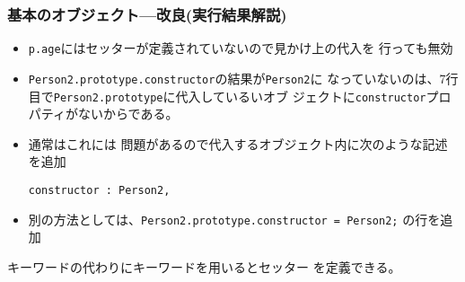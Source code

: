 \documentclass[dvipsk]{beamer}
\begin{document}
\begin{frame}[containsverbatim]
 \frametitle{基本のオブジェクト---改良(実行結果解説)}
\begin{itemize}
 \item \texttt{p.age}にはセッターが定義されていないので見かけ上の代入を
       行っても無効
 \item \texttt{Person2.prototype.constructor}の結果が\texttt{Person2}に
なっていないのは、7行目で\texttt{Person2.prototype}に代入しているいオブ
       ジェクトに\texttt{constructor}プロパティがないからである。
 \item  通常はこれには
問題があるので代入するオブジェクト内に次のような記述を追加
\begin{verbatim}
constructor : Person2,
\end{verbatim}
 \item 別の方法としては、\texttt{Person2.prototype.constructor = Person2;}
の行を追加
\end{itemize}

キーワードの代わりにキーワードを用いるとセッター
を定義できる。
\end{frame}
\end{document}
